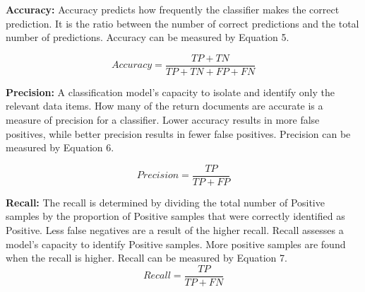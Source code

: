 \documentclass[conference]{IEEEtran}
\begin{document}





\textbf{Accuracy:} Accuracy predicts how frequently the classifier makes the correct prediction. It is the ratio between the number of correct predictions and the total number of predictions. Accuracy can be measured by Equation 5.

\begin{equation}
   Accuracy=\frac{TP+TN}{TP+TN+FP+FN}
\end{equation}



\vspace{0.5cm}
\textbf{Precision:} A classification model's capacity to isolate and identify only the relevant data items. How many of the return documents are accurate is a measure of precision for a classifier. Lower accuracy results in more false positives, while better precision results in fewer false positives. Precision can be measured by Equation 6.

\begin{equation}
  Precision = \frac{TP}{TP+FP}
\end{equation}

\vspace{0.5cm}
\textbf{Recall:} The recall is determined by dividing the total number of Positive samples by the proportion of Positive samples that were correctly identified as Positive. Less false negatives are a result of the higher recall. Recall assesses a model's capacity to identify Positive samples. More positive samples are found when the recall is higher. Recall can be measured by Equation 7.
\begin{equation}
  Recall = \frac{TP}{TP+FN}
\end{equation}
\end{document}
